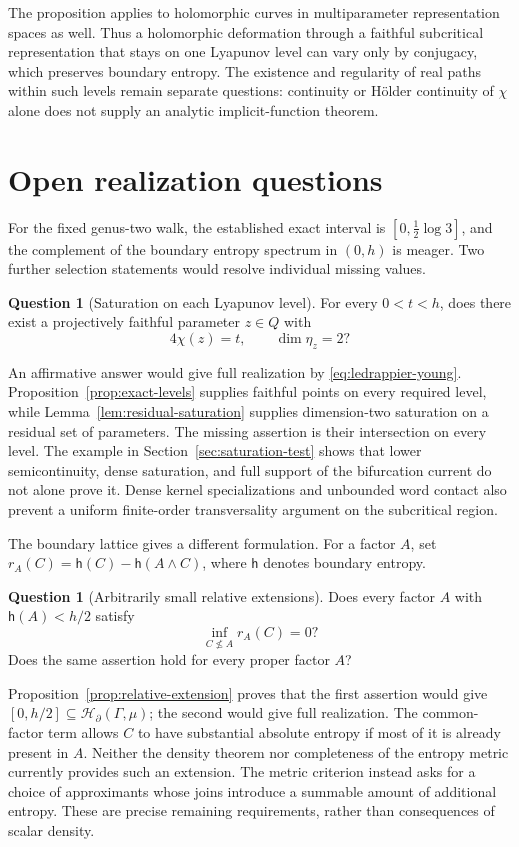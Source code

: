 \documentclass[11pt,letterpaper]{amsart}
\theoremstyle{definition}
\newtheorem{question}[theorem]{Question}
\theoremstyle{remark}
\numberwithin{equation}{section}
\newcommand{\HH}{\mathscr H_{\partial}}
\begin{document}
The proposition applies to holomorphic curves in multiparameter
representation spaces as well. Thus a holomorphic deformation through
a faithful subcritical representation that stays on one Lyapunov level
can vary only by conjugacy, which preserves boundary entropy.
The existence and regularity of real paths within such levels remain
separate questions: continuity or H\"older continuity of $\chi$ alone
does not supply an analytic implicit-function theorem.

\section{Open realization questions}\label{sec:open-problems}

For the fixed genus-two walk, the established exact interval is
$[0,\frac12\log3]$, and the complement of the boundary entropy spectrum
in $(0,h)$ is meager. Two further selection statements would resolve
individual missing values.

\begin{question}[Saturation on each Lyapunov level]
For every $0<t<h$, does there exist a projectively faithful parameter
$z\in Q$ with
\[
 4\chi(z)=t,\qquad \dim\eta_z=2?
\]
\end{question}

An affirmative answer would give full realization by
\eqref{eq:ledrappier-young}. Proposition~\ref{prop:exact-levels} supplies
faithful points on every required level, while
Lemma~\ref{lem:residual-saturation} supplies dimension-two saturation
on a residual set of parameters. The missing assertion is their
intersection on every level. The example in Section~\ref{sec:saturation-test}
shows that lower semicontinuity, dense saturation, and full support of
the bifurcation current do not alone prove it. Dense kernel
specializations and unbounded word contact also prevent a uniform
finite-order transversality argument on the subcritical region.

The boundary lattice gives a different formulation. For a factor $A$,
set $r_A(C)=\mathsf h(C)-\mathsf h(A\wedge C)$, where $\mathsf h$
denotes boundary entropy.

\begin{question}[Arbitrarily small relative extensions]
Does every factor $A$ with $\mathsf h(A)<h/2$ satisfy
\[
 \inf_{C\not\le A}r_A(C)=0?
\]
Does the same assertion hold for every proper factor $A$?
\end{question}

Proposition~\ref{prop:relative-extension} proves that the first assertion
would give $[0,h/2]\subseteq\HH(\Gamma,\mu)$; the second would give
full realization. The common-factor term allows $C$ to have substantial
absolute entropy if most of it is already present in $A$. Neither the
density theorem nor completeness of the entropy metric currently
provides such an extension. The metric criterion instead asks for a
choice of approximants whose joins introduce a summable amount of
additional entropy. These are precise remaining requirements, rather
than consequences of scalar density.
\end{document}
